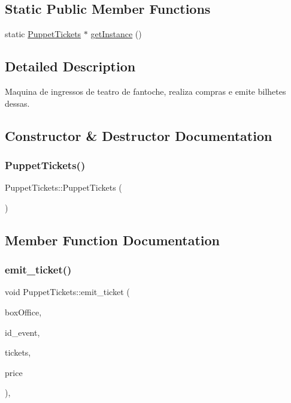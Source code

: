 \subsection*{Static Public Member Functions}
\begin{DoxyCompactItemize}
\item 
static \hyperlink{class_puppet_tickets}{Puppet\+Tickets} $\ast$ \hyperlink{class_puppet_tickets_a49284dd6d0a41760127a9706c2591c01}{get\+Instance} ()
\end{DoxyCompactItemize}


\subsection{Detailed Description}
Maquina de ingressos de teatro de fantoche, realiza compras e emite bilhetes dessas. 

\subsection{Constructor \& Destructor Documentation}
\mbox{\label{class_puppet_tickets_ac5cbccccc59aa7c88ebebab8b97eafdf}} 
\subsubsection{\texorpdfstring{Puppet\+Tickets()}{PuppetTickets()}}
{\footnotesize\ttfamily Puppet\+Tickets\+::\+Puppet\+Tickets (\begin{DoxyParamCaption}{ }\end{DoxyParamCaption})}



\subsection{Member Function Documentation}
\mbox{\label{class_puppet_tickets_a1d458fbaa6f21e2ba82c805299bb5025}} 
\subsubsection{\texorpdfstring{emit\+\_\+ticket()}{emit\_ticket()}}
{\footnotesize\ttfamily void Puppet\+Tickets\+::emit\+\_\+ticket (\begin{DoxyParamCaption}\item[{\hyperlink{class_box_office}{Box\+Office} $\ast$}]{box\+Office,  }\item[{int}]{id\+\_\+event,  }\item[{int}]{tickets,  }\item[{int}]{price }\end{DoxyParamCaption})\hspace{0.3cm}{\ttfamily [override]}, {\ttfamily [virtual]}}



